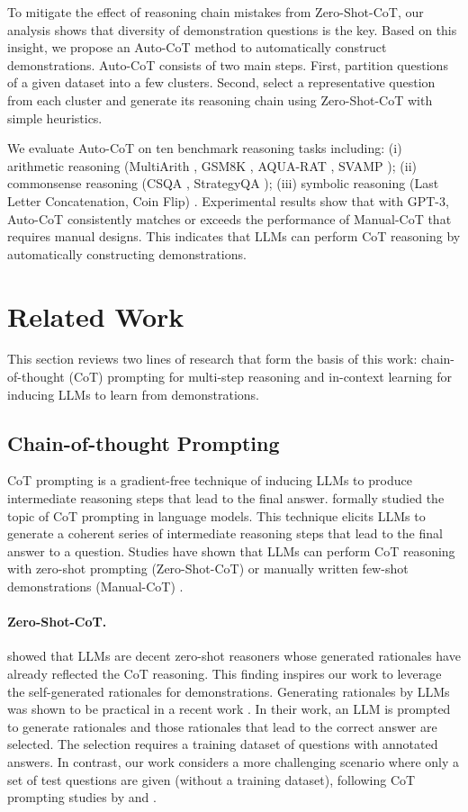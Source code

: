 To mitigate the effect of reasoning chain mistakes from Zero-Shot-CoT, our analysis shows that
diversity of demonstration questions is the key. Based on this insight, we propose an Auto-CoT method to automatically construct demonstrations. Auto-CoT consists of two main steps. First, partition questions of a given dataset into a few clusters. Second, select a representative question from each cluster and generate its reasoning chain using Zero-Shot-CoT with simple heuristics.

We evaluate Auto-CoT on ten benchmark reasoning tasks including: (i) arithmetic reasoning (MultiArith \citep{multiarith}, GSM8K \citep{gsm8k}, AQUA-RAT \citep{aqua}, SVAMP \citep{svamp}); (ii) commonsense reasoning (CSQA \citep{commonsenseqa}, StrategyQA \citep{strategyqa}); (iii) symbolic reasoning (Last Letter Concatenation, Coin Flip) \citep{cot_wei}. Experimental results show that with GPT-3, Auto-CoT consistently matches or exceeds the performance of Manual-CoT that requires manual designs. This indicates that LLMs can perform CoT reasoning by automatically constructing demonstrations. 

\section{Related Work}  
This section reviews two lines of research that form the basis of this work: chain-of-thought (CoT) prompting for multi-step reasoning and in-context learning for inducing LLMs to learn from demonstrations.

\subsection{Chain-of-thought Prompting}
CoT prompting is a gradient-free technique of inducing LLMs to produce intermediate reasoning steps that lead to the final answer. \citet{cot_wei} formally studied the topic of CoT prompting in language models. This technique elicits LLMs to generate a coherent series of intermediate reasoning steps that lead to the final answer to a question. Studies have shown that LLMs can perform CoT reasoning with zero-shot prompting (Zero-Shot-CoT) \citep{kojima2022large} or manually written few-shot demonstrations (Manual-CoT) \citep{cot_wei}.

\paragraph{Zero-Shot-CoT.} \citet{kojima2022large} showed that LLMs are decent zero-shot reasoners whose generated rationales have already reflected the CoT reasoning. This finding inspires our work to leverage the self-generated rationales for demonstrations. Generating rationales by LLMs was shown to be practical in a recent work \citep{zelikman2022star}. In their work, an LLM is prompted to generate rationales and those rationales that lead to the correct answer are selected. The selection requires a training dataset of questions with annotated answers. In contrast, our work considers a more challenging scenario where only a set of test questions are given (without a training dataset), following CoT prompting studies by \citet{cot_wei} and \citet{kojima2022large}.

